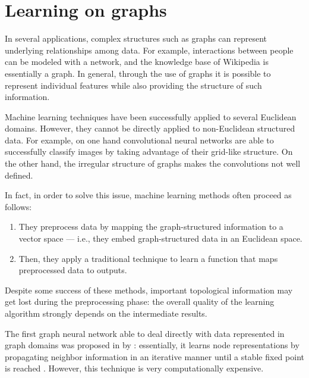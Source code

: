 \chapter{Learning on graphs}\label{ml_graphs_chapter}
    In several applications, complex structures such as graphs can represent underlying relationships among data. For example, interactions between people can be modeled with a network, and the knowledge base of Wikipedia is essentially a graph. In general, through the use of graphs it is possible to represent individual features while also providing the structure of such information.
    
    Machine learning techniques have been successfully applied to several Euclidean domains. However, they cannot be directly applied to non-Euclidean structured data. For example, on one hand convolutional neural networks are able to successfully classify images by taking advantage of their grid-like structure. On the other hand, the irregular structure of graphs makes the convolutions not well defined.
    
    In fact, in order to solve this issue, machine learning methods often proceed as follows:
    \begin{enumerate}
        \item They preprocess data by mapping the graph-structured information to a vector space --- i.e., they embed graph-structured data in an Euclidean space.
        \item Then, they apply a traditional technique to learn a function that maps preprocessed data to outputs.
    \end{enumerate}
    Despite some success of these methods, important topological information may get lost during the preprocessing phase: the overall quality of the learning algorithm strongly depends on the intermediate results.
    
    The first graph neural network able to deal directly with data represented in graph domains was proposed in \citeyear{Scarselli} by \citeauthor{Scarselli}: essentially, it learns node representations by propagating neighbor information in an iterative manner until a stable fixed point is reached \cite{Scarselli}\cite{Wu}. However, this technique is very computationally expensive.
    
